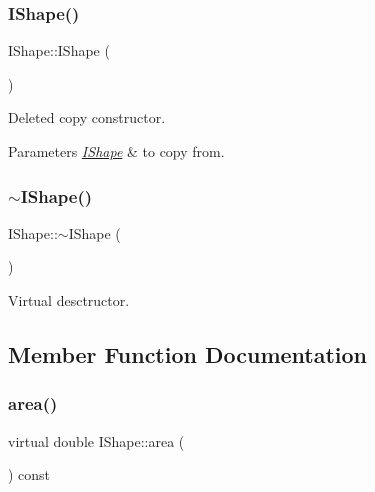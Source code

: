\subsubsection{\texorpdfstring{IShape()}{IShape()}\hspace{0.1cm}{\footnotesize\ttfamily [2/2]}}
{\footnotesize\ttfamily I\+Shape\+::\+I\+Shape (\begin{DoxyParamCaption}\item[{const \mbox{\hyperlink{class_i_shape}{I\+Shape}} \&}]{ }\end{DoxyParamCaption})\hspace{0.3cm}{\ttfamily [delete]}}



Deleted copy constructor. 


\begin{DoxyParams}{Parameters}
{\em \mbox{\hyperlink{class_i_shape}{I\+Shape}}} & to copy from. \\
\hline
\end{DoxyParams}
\mbox{\label{class_i_shape_aec9c445c0213374af733e2038d702630}} 
\subsubsection{\texorpdfstring{$\sim$IShape()}{~IShape()}}
{\footnotesize\ttfamily I\+Shape\+::$\sim$\+I\+Shape (\begin{DoxyParamCaption}{ }\end{DoxyParamCaption})\hspace{0.3cm}{\ttfamily [virtual]}}



Virtual desctructor. 



\subsection{Member Function Documentation}
\mbox{\label{class_i_shape_aed742a160acdd13c9cfdeb16e605afea}} 
\subsubsection{\texorpdfstring{area()}{area()}}
{\footnotesize\ttfamily virtual double I\+Shape\+::area (\begin{DoxyParamCaption}{ }\end{DoxyParamCaption}) const\hspace{0.3cm}{\ttfamily [pure virtual]}}




